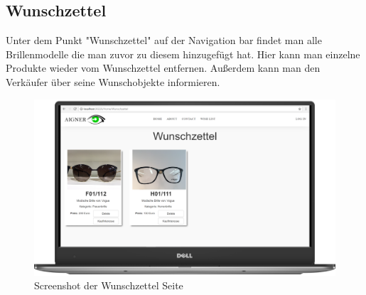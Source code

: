 \subsection{Wunschzettel}
Unter dem Punkt "Wunschzettel" auf der Navigation bar findet man alle Brillenmodelle die man zuvor zu diesem hinzugefügt hat. Hier kann man einzelne Produkte wieder vom Wunschzettel entfernen. Außerdem kann man den Verkäufer über seine Wunschobjekte informieren.
\begin{figure}[H]
\begin{center}
	\includegraphics[scale=.2]{images/Wunschzettel.png}
\end{center}
	\caption{Screenshot der Wunschzettel Seite}
	\label{fig:sample}
\end{figure}

